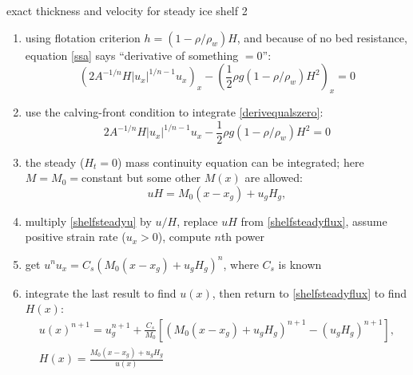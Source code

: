 \begin{frame}{exact thickness and velocity for steady ice shelf 2}

\small
  \begin{enumerate}
  \item using flotation criterion $h = (1-\rho/\rho_w) H$, and because of no bed resistance, equation \eqref{ssa} says ``derivative of something $=0$'':
\begin{equation}
  \left(2 A^{-1/n} H |u_x|^{1/n - 1} u_x\right)_x - \left(\frac{1}{2} \rho g (1-\rho/\rho_w) H^2\right)_x = 0  \label{derivequalszero}
\end{equation}
  \item use the calving-front condition to integrate \eqref{derivequalszero}:
\begin{equation}
2 A^{-1/n} H |u_x|^{1/n - 1} u_x - \frac{1}{2} \rho g (1-\rho/\rho_w) H^2 = 0  \label{shelfsteadyu}
\end{equation}
  \item the steady  ($H_t=0$) mass continuity equation can be integrated; here $M=M_0=$constant but some other $M(x)$ are allowed:
\begin{equation}
uH = M_0(x-x_g) + u_g H_g,  \label{shelfsteadyflux}
\end{equation}
  \item multiply \eqref{shelfsteadyu} by $u/H$, replace $uH$ from \eqref{shelfsteadyflux}, assume positive strain rate ($u_x>0$), compute $n$th power
  \item get $u^n u_x = C_s \left(M_0(x-x_g) + u_g H_g\right)^n$, where $C_s$ is known
  \item integrate the last result to find $u(x)$, then return to \eqref{shelfsteadyflux} to find $H(x)$:
\begin{gather*}
u(x)^{n+1} = u_g^{n+1} + \frac{C_s}{M_0} \left[\left(M_0(x-x_g) + u_g H_g\right)^{n+1} - (u_g H_g)^{n+1}\right], \\
H(x) = \frac{M_0(x-x_g) + u_g H_g}{u(x)}
\end{gather*}
  \end{enumerate}
\end{frame}


